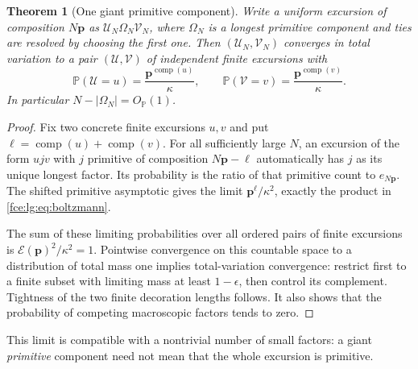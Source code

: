 \documentclass[11pt,a4paper]{article}
\numberwithin{equation}{section}
\newtheorem{theorem}{Theorem}[section]
\theoremstyle{definition}\newtheorem{definition}[theorem]{Definition}
\theoremstyle{remark}\newtheorem{remark}[theorem]{Remark}
\newcommand{\E}{\mathcal E}
\newcommand{\Prob}{\mathbb P}
\begin{document}
\begin{theorem}[One giant primitive component]\label{fce:lg:thm:giant}
Write a uniform excursion of composition $N\boldsymbol p$ as
$\mathcal U_N \Omega_N \mathcal V_N$, where $\Omega_N$ is a longest primitive
component and ties are resolved by choosing the first one. Then
$(\mathcal U_N,\mathcal V_N)$ converges in total variation to a pair
$(\mathcal U,\mathcal V)$ of independent finite excursions with
\begin{equation}\label{fce:lg:eq:boltzmann}
 \Prob(\mathcal U=u)=\frac{\boldsymbol p^{\operatorname{comp}(u)}}{\kappa},\qquad
 \Prob(\mathcal V=v)=\frac{\boldsymbol p^{\operatorname{comp}(v)}}{\kappa}.
\end{equation}
In particular $N-|\Omega_N|=O_{\Prob}(1)$.
\end{theorem}
\begin{proof}
Fix two concrete finite excursions $u,v$ and put
$\boldsymbol\ell=\operatorname{comp}(u)+\operatorname{comp}(v)$. For all
sufficiently large $N$, an excursion of the form $u j v$ with $j$ primitive
of composition $N\boldsymbol p-\boldsymbol\ell$ automatically has $j$ as its
unique longest factor. Its probability is the ratio of that primitive count
to $e_{N\boldsymbol p}$. The shifted primitive asymptotic gives the limit
$\boldsymbol p^{\boldsymbol\ell}/\kappa^2$, exactly the product in
\eqref{fce:lg:eq:boltzmann}.

The sum of these limiting probabilities over all ordered pairs of finite
excursions is $\E(\boldsymbol p)^2/\kappa^2=1$. Pointwise convergence on
this countable space to a distribution of total mass one implies
total-variation convergence: restrict first to a finite subset with
limiting mass at least $1-\epsilon$, then control its complement. Tightness
of the two finite decoration lengths follows. It also shows that the
probability of competing macroscopic factors tends to zero.
\end{proof}
This limit is compatible with a nontrivial number of small factors: a
giant \emph{primitive} component need not mean that the whole excursion is
primitive.
\end{document}
